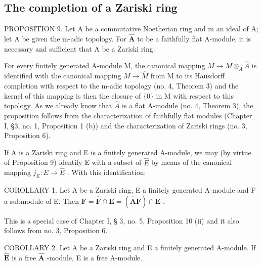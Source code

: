 \subsection{The completion of a Zariski ring}

PROPOSITION 9. Let A be a commutative Noetherian ring and m an ideal of A; let A be given the m-adic topology. For \(\hat{\mathbf{A}}\) to be a faithfully flat A-module, it is necessary and sufficient that A be a Zariski ring.

For every finitely generated A-module M, the canonical mapping \(M \to M \otimes_{A} \hat{A}\) is identified with the canonical mapping \(M \to \hat{M}\) from M to its Hausdorff completion with respect to the m-adic topology (no. 4, Theorem 3) and the kernel of this mapping is then the closure of \(\{0\}\) in M with respect to this topology. As we already know that \(\hat{A}\) is a flat A-module (no. 4, Theorem 3), the proposition follows from the characterization of faithfully flat modules (Chapter I, §3, no. 1, Proposition 1 (b)) and the characterization of Zariski rings (no. 3, Proposition 6).

If A is a Zariski ring and E is a finitely generated A-module, we may (by virtue of Proposition 9) identify E with a subset of \(\hat{E}\) by means of the canonical mapping \(j_{E}: E \to \hat{E}\) . With this identification:

COROLLARY 1. Let A be a Zariski ring, E a finitely generated A-module and F a submodule of E. Then \(\mathbf{F} = \hat{\mathbf{F}} \cap \mathbf{E} = (\hat{\mathbf{A}}\mathbf{F}) \cap \mathbf{E}\) .

This is a special case of Chapter I, § 3, no. 5, Proposition 10 (ii) and it also follows from no. 3, Proposition 6.

COROLLARY 2. Let A be a Zariski ring and E a finitely generated A-module. If \(\hat{\mathbf{E}}\) is a free \(\hat{\mathbf{A}}\) -module, E is a free A-module.

